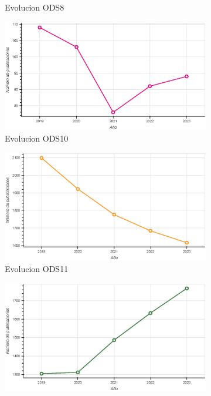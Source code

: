 \begin{figure}[H]
\begin{subfigure}{0.45\textwidth}
        \captionsetup{justification=centering}
        \caption{Evolucion ODS8}
        \label{fig:Evolucion ods8}
    \end{subfigure}
    \begin{subfigure}{0.45\textwidth}
        \includegraphics[width=0.9\linewidth]{imagenes/EvolucionOds10.eps} 
        \captionsetup{justification=centering}
        \caption{Evolucion ODS10}
        \label{fig:Evolucion ods10}
    \end{subfigure}
    \begin{subfigure}{0.45\textwidth}
        \includegraphics[width=0.9\linewidth]{imagenes/EvolucionOds11.eps} 
        \captionsetup{justification=centering}
        \caption{Evolucion ODS11}
        \label{fig:Evolucion ods11}
    \end{subfigure}
    \begin{subfigure}{0.45\textwidth}
        \includegraphics[width=0.9\linewidth]{imagenes/EvolucionOds13.eps} 

\end{subfigure}
\end{figure}
